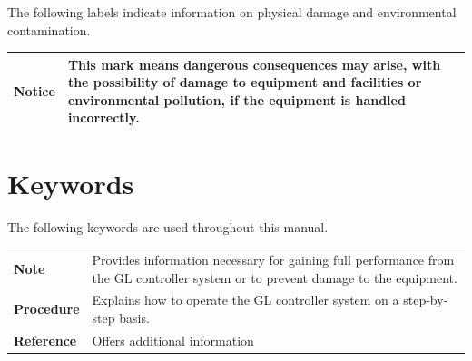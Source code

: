 \documentclass[11pt,twoside]{book}
\begin{document}
{{{The following labels indicate information on physical damage and
environmental contamination.

\begin{longtable}[]{@{}ll@{}}
\toprule
\endhead
\begin{minipage}[t]{0.28\columnwidth}\raggedright
Notice\strut
\end{minipage} & \begin{minipage}[t]{0.66\columnwidth}\raggedright
This mark means dangerous consequences may arise, with the possibility
of damage to equipment and facilities or environmental pollution, if the
equipment is handled incorrectly.\strut
\end{minipage}\tabularnewline
\bottomrule
\end{longtable}

\hypertarget{keywords}{%
\section{Keywords}

The following keywords are used throughout this manual.

\begin{longtable}[]{@{}ll@{}}
\toprule
\endhead
\begin{minipage}[t]{0.28\columnwidth}\raggedright
\textbf{Note}\strut
\end{minipage} & \begin{minipage}[t]{0.66\columnwidth}\raggedright
Provides information necessary for gaining full performance from the GL
controller system or to prevent damage to the equipment.\strut
\end{minipage}\tabularnewline
\begin{minipage}[t]{0.28\columnwidth}\raggedright
\textbf{Procedure}\strut
\end{minipage} & \begin{minipage}[t]{0.66\columnwidth}\raggedright
Explains how to operate the GL controller system on a step-by-step
basis.\strut
\end{minipage}\tabularnewline
\begin{minipage}[t]{0.28\columnwidth}\raggedright
\textbf{Reference}\strut
\end{minipage} & \begin{minipage}[t]{0.66\columnwidth}\raggedright
Offers additional information\strut
\end{minipage}\tabularnewline
\bottomrule
\end{longtable}

}}}}
\end{document}
